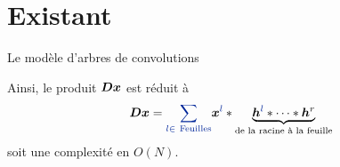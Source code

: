 \section{Existant}






\begin{frame}{Le modèle d'arbres de convolutions}
\begin{figure}\centering
{}
\end{figure}
Ainsi, le produit $\bm{D}\bm{x}$ est réduit à
\begin{equation} 
\D \x = \Beq{\sum_{l \in ~\text{Feuilles}}} \x^{\Beq{l}} * \underbrace{\h^{\Beq{l}}* \dots* \h^{r}}_{\textrm{de la racine à la feuille}}
\end{equation}
soit une complexité en $O(N)$.
\end{frame}
 


